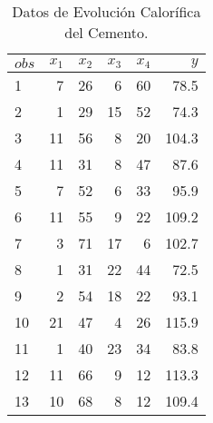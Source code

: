 \documentclass[10.5pt,notitlepage]{article}
\theoremstyle{plain}
\begin{document}
 \begin{table}[htbp]
        \caption{Datos de Evolución Calorífica del Cemento.}
        \centering\begin{tabular}{@{}l@{\hskip 0.3in}r@{\hskip 0.3in}r@{\hskip 0.3in}r@{\hskip 0.3in}r@{\hskip 0.3in}r@{}}
            \toprule
            $obs$ & $x_1$ & $x_2$ & $x_3$ &\(x_4\) &\(y\)\\
            \midrule
  1  &   7   &  26  &    6   &  60  &  78.5\\
  2  &     1 &    29 &    15 &    52 &   74.3\\
  3    &  11 &    56 &     8 &    20 &  104.3\\
  4     & 11 &    31 &     8 &    47 &   87.6\\
  5   &    7  &   52 &     6 &    33 &   95.9\\
  6    &  11  &   55  &    9 &    22 &  109.2\\
  7     &  3  &   71  &   17 &     6 &  102.7\\
  8   &    1  &   31  &   22 &    44 &   72.5\\
  9    &   2  &   54  &   18 &    22 &   93.1\\
 10     & 21  &   47  &    4 &    26 &  115.9\\
 11  &     1  &   40  &   23&     34 &   83.8\\
 12   &   11  &     66&      9 &  12&   113.3\\
 13     & 10  &     68&      8&   12&   109.4\\
            \bottomrule
        \end{tabular}
        \label{tab:2}
\end{table}
\end{document}

